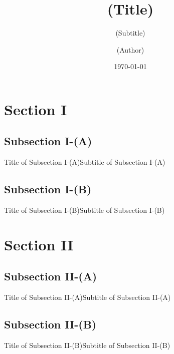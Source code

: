 \documentclass{beamer}
\title{(Title)}
\subtitle{(Subtitle)}
\author{(Author)}
\date{\today}
\institute{(Institute)}
\begin{document}
\begin{frame}
	\titlepage
\end{frame}

\begin{frame}
	\tableofcontents
\end{frame}

\section{Section I}
\subsection{Subsection I-(A)}
\begin{frame}{Title of Subsection I-(A)}{Subtitle of Subsection I-(A)}
\end{frame}

\subsection{Subsection I-(B)}
\begin{frame}{Title of Subsection I-(B)}{Subtitle of Subsection I-(B)}
\end{frame}

\section{Section II}
\subsection{Subsection II-(A)}
\begin{frame}{Title of Subsection II-(A)}{Subtitle of Subsection II-(A)}
\end{frame}

\subsection{Subsection II-(B)}
\begin{frame}{Title of Subsection II-(B)}{Subtitle of Subsection II-(B)}
\end{frame}
\end{document}
